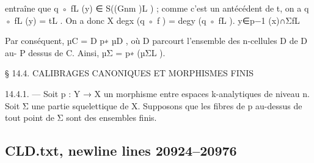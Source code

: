 \documentclass[
  10pt,
]{article}
\newenvironment{Shaded}{}{}
\newcommand{\NormalTok}[1]{#1}
\begin{document}
\begin{Shaded}
\begin{Highlighting}[]
\NormalTok{entraîne que q ◦ fL (y) ∈ S((Gnm )L ) ; comme c’est un antécédent de t, on a q ◦ fL (y) = tL .}
\NormalTok{On a donc                                    X}
\NormalTok{                          degx (q ◦ f ) =            degy (q ◦ fL ).}
\NormalTok{                                            y∈p−1 (x)∩ΣfL}

\NormalTok{Par conséquent, µC = D p∗ µD , où D parcourt l’ensemble des n{-}cellules D de D au{-}}
\NormalTok{                         P}
\NormalTok{dessus de C. Ainsi, µΣ = p∗ (µΣL ).}




\NormalTok{       § 14.4. CALIBRAGES CANONIQUES ET MORPHISMES FINIS}

\NormalTok{14.4.1. — Soit p : Y → X un morphisme entre espaces k{-}analytiques de niveau n.}
\NormalTok{Soit Σ une partie squelettique de X. Supposons que les fibres de p au{-}dessus de tout}
\NormalTok{point de Σ sont des ensembles finis.}
\end{Highlighting}
\end{Shaded}

\subsection{CLD.txt, newline lines
20924--20976}\label{cld.txt-newline-lines-2092420976}
\end{document}
